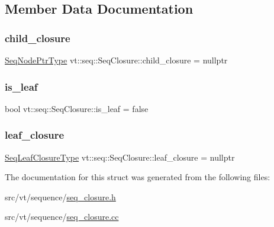 \subsection{Member Data Documentation}
\mbox{\label{structvt_1_1seq_1_1_seq_closure_afb90e1523500d229a84622ea78174e19}} 
\subsubsection{\texorpdfstring{child\+\_\+closure}{child\_closure}}
{\footnotesize\ttfamily \hyperlink{namespacevt_1_1seq_ae6a4874b585be0612aaca32ca6d2d191}{Seq\+Node\+Ptr\+Type} vt\+::seq\+::\+Seq\+Closure\+::child\+\_\+closure = nullptr}

\mbox{\label{structvt_1_1seq_1_1_seq_closure_aa2ac69110e7697d2250b218b227ce60a}} 
\subsubsection{\texorpdfstring{is\+\_\+leaf}{is\_leaf}}
{\footnotesize\ttfamily bool vt\+::seq\+::\+Seq\+Closure\+::is\+\_\+leaf = false}

\mbox{\label{structvt_1_1seq_1_1_seq_closure_a8489de87b5b4d74cbcfb7e8624068907}} 
\subsubsection{\texorpdfstring{leaf\+\_\+closure}{leaf\_closure}}
{\footnotesize\ttfamily \hyperlink{namespacevt_1_1seq_a13c76fb1c62795dfd2d359b2dde35e8a}{Seq\+Leaf\+Closure\+Type} vt\+::seq\+::\+Seq\+Closure\+::leaf\+\_\+closure = nullptr}



The documentation for this struct was generated from the following files\+:\begin{DoxyCompactItemize}
\item 
src/vt/sequence/\hyperlink{seq__closure_8h}{seq\+\_\+closure.\+h}\item 
src/vt/sequence/\hyperlink{seq__closure_8cc}{seq\+\_\+closure.\+cc}\end{DoxyCompactItemize}
